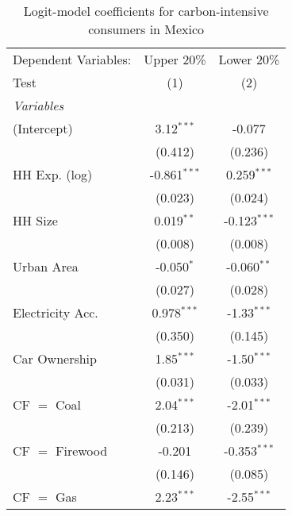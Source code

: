 
\begin{table}[htbp!]
   \centering
   \small
   \begin{adjustbox}{width = 1\textwidth, max height = 0.95\textheight, center}
      \begin{threeparttable}[b]
         \caption{\label{tab:Logit_1_MEX} Logit-model coefficients for carbon-intensive consumers in Mexico}
         \begin{tabular}{lcc}
            \tabularnewline \midrule \midrule
            Dependent Variables: & Upper 20\%     & Lower 20\%\\   
            Test                 & (1)            & (2)\\  
            \midrule
            \emph{Variables}\\
            (Intercept)          & 3.12$^{***}$   & -0.077\\   
                                 & (0.412)        & (0.236)\\   
            HH Exp. (log)        & -0.861$^{***}$ & 0.259$^{***}$\\   
                                 & (0.023)        & (0.024)\\   
            HH Size              & 0.019$^{**}$   & -0.123$^{***}$\\   
                                 & (0.008)        & (0.008)\\   
            Urban Area           & -0.050$^{*}$   & -0.060$^{**}$\\   
                                 & (0.027)        & (0.028)\\   
            Electricity Acc.     & 0.978$^{***}$  & -1.33$^{***}$\\   
                                 & (0.350)        & (0.145)\\   
            Car Ownership        & 1.85$^{***}$   & -1.50$^{***}$\\   
                                 & (0.031)        & (0.033)\\   
            CF $=$ Coal          & 2.04$^{***}$   & -2.01$^{***}$\\   
                                 & (0.213)        & (0.239)\\   
            CF $=$ Firewood      & -0.201         & -0.353$^{***}$\\   
                                 & (0.146)        & (0.085)\\   
            CF $=$ Gas           & 2.23$^{***}$   & -2.55$^{***}$\\   

\end{tabular}
\end{threeparttable}
\end{adjustbox}
\end{table}

